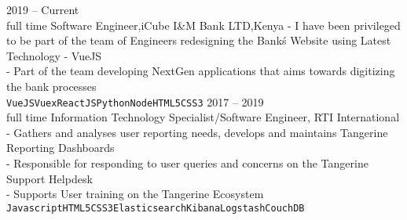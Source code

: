 \documentclass[9pt]{developercv} %
\begin{document}
\begin{entrylist}
	\entry
	{2019 -- Current\\\footnotesize{full time}}
	{Software Engineer,iCube}
	{I\&M  Bank LTD,Kenya}
	{- I have been privileged to be part of the team of Engineers redesigning the Bank\'s Website using Latest Technology - VueJS\\
		- Part of the team developing NextGen applications that aims towards digitizing the bank processes\\
		\texttt{VueJS}\slashsep\texttt{Vuex}\slashsep\texttt{ReactJS}\slashsep\texttt{Python}\slashsep\texttt{Node}\slashsep\texttt{HTML5}\slashsep\texttt{CSS3}}	
	\entry
		{2017 -- 2019\\\footnotesize{full time}}
		{Information Technology Specialist/Software Engineer,}
		{RTI International}
		{- Gathers and analyses user reporting needs, develops and maintains Tangerine Reporting Dashboards\\
			- Responsible for responding to user queries and concerns on the Tangerine Support Helpdesk\\
			- Supports User training on the Tangerine Ecosystem\\
		\texttt{Javascript}\slashsep\texttt{HTML5}\slashsep\texttt{CSS3}\slashsep\texttt{Elasticsearch}\slashsep\texttt{Kibana}\slashsep\texttt{Logstash}\slashsep\texttt{CouchDB}}	
			


\end{entrylist}
\end{document}
